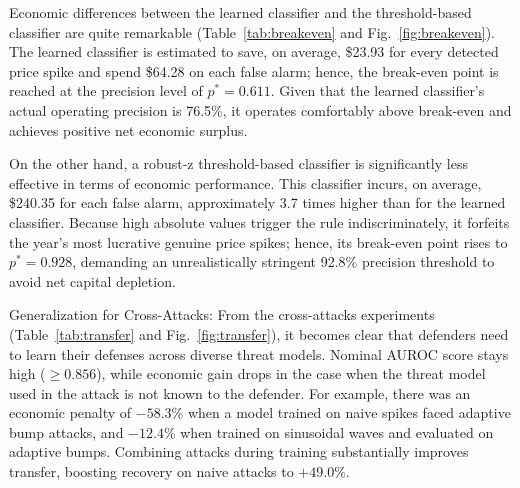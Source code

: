 \documentclass[journal]{IEEEtran}
\begin{document}
Economic differences between the learned classifier and the threshold-based classifier are quite remarkable (Table~\ref{tab:breakeven} and Fig.~\ref{fig:breakeven}). The learned classifier is estimated to save, on average, \$23.93 for every detected price spike and spend \$64.28 on each false alarm; hence, the break-even point is reached at the precision level of $p^* = 0.611$. Given that the learned classifier's actual operating precision is 76.5\%, it operates comfortably above break-even and achieves positive net economic surplus.

On the other hand, a robust-z threshold-based classifier is significantly less effective in terms of economic performance. This classifier incurs, on average, \$240.35 for each false alarm, approximately 3.7 times higher than for the learned classifier. Because high absolute values trigger the rule indiscriminately, it forfeits the year's most lucrative genuine price spikes; hence, its break-even point rises to $p^* = 0.928$, demanding an unrealistically stringent 92.8\% precision threshold to avoid net capital depletion.

Generalization for Cross-Attacks: From the cross-attacks experiments (Table~\ref{tab:transfer} and Fig.~\ref{fig:transfer}), it becomes clear that defenders need to learn their defenses across diverse threat models. Nominal AUROC score stays high ($\geq 0.856$), while economic gain drops in the case when the threat model used in the attack is not known to the defender. For example, there was an economic penalty of $-58.3\%$ when a model trained on naive spikes faced adaptive bump attacks, and $-12.4\%$ when trained on sinusoidal waves and evaluated on adaptive bumps. Combining attacks during training substantially improves transfer, boosting recovery on naive attacks to $+49.0\%$.
\end{document}
